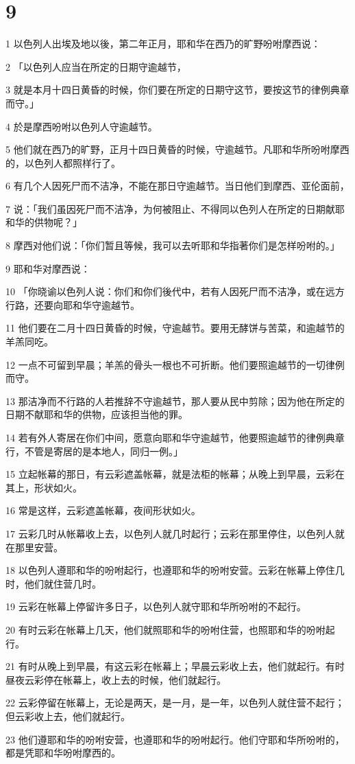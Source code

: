 \chapter{9}

\par 1 以色列人出埃及地以後，第二年正月，耶和华在西乃的旷野吩咐摩西说：
\par 2 「以色列人应当在所定的日期守逾越节，
\par 3 就是本月十四日黄昏的时候，你们要在所定的日期守这节，要按这节的律例典章而守。」
\par 4 於是摩西吩咐以色列人守逾越节。
\par 5 他们就在西乃的旷野，正月十四日黄昏的时候，守逾越节。凡耶和华所吩咐摩西的，以色列人都照样行了。
\par 6 有几个人因死尸而不洁净，不能在那日守逾越节。当日他们到摩西、亚伦面前，
\par 7 说：「我们虽因死尸而不洁净，为何被阻止、不得同以色列人在所定的日期献耶和华的供物呢？」
\par 8 摩西对他们说：「你们暂且等候，我可以去听耶和华指著你们是怎样吩咐的。」
\par 9 耶和华对摩西说：
\par 10 「你晓谕以色列人说：你们和你们後代中，若有人因死尸而不洁净，或在远方行路，还要向耶和华守逾越节。
\par 11 他们要在二月十四日黄昏的时候，守逾越节。要用无酵饼与苦菜，和逾越节的羊羔同吃。
\par 12 一点不可留到早晨；羊羔的骨头一根也不可折断。他们要照逾越节的一切律例而守。
\par 13 那洁净而不行路的人若推辞不守逾越节，那人要从民中剪除；因为他在所定的日期不献耶和华的供物，应该担当他的罪。
\par 14 若有外人寄居在你们中间，愿意向耶和华守逾越节，他要照逾越节的律例典章行，不管是寄居的是本地人，同归一例。」
\par 15 立起帐幕的那日，有云彩遮盖帐幕，就是法柜的帐幕；从晚上到早晨，云彩在其上，形状如火。
\par 16 常是这样，云彩遮盖帐幕，夜间形状如火。
\par 17 云彩几时从帐幕收上去，以色列人就几时起行；云彩在那里停住，以色列人就在那里安营。
\par 18 以色列人遵耶和华的吩咐起行，也遵耶和华的吩咐安营。云彩在帐幕上停住几时，他们就住营几时。
\par 19 云彩在帐幕上停留许多日子，以色列人就守耶和华所吩咐的不起行。
\par 20 有时云彩在帐幕上几天，他们就照耶和华的吩咐住营，也照耶和华的吩咐起行。
\par 21 有时从晚上到早晨，有这云彩在帐幕上；早晨云彩收上去，他们就起行。有时昼夜云彩停在帐幕上，收上去的时候，他们就起行。
\par 22 云彩停留在帐幕上，无论是两天，是一月，是一年，以色列人就住营不起行；但云彩收上去，他们就起行。
\par 23 他们遵耶和华的吩咐安营，也遵耶和华的吩咐起行。他们守耶和华所吩咐的，都是凭耶和华吩咐摩西的。

